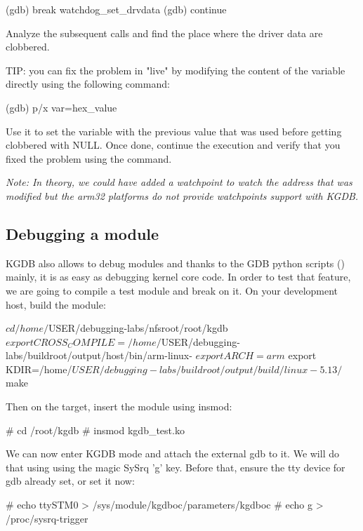 \begin{bashinput}
(gdb) break watchdog_set_drvdata
(gdb) continue
\end{bashinput}

Analyze the subsequent calls and find the place where the driver data are
clobbered.

TIP: you can fix the problem in "live" by modifying the content of the
 variable directly using the following command:

\begin{bashinput}
(gdb) p/x var=hex_value
\end{bashinput}

Use it to set the variable with the previous value that was used before getting
clobbered with NULL. Once done, continue the execution and verify that you fixed
the problem using the  command.

{\em Note: In theory, we could have added a watchpoint to watch the address that
was modified but the arm32 platforms do not provide watchpoints support with
KGDB.}

\subsection{Debugging a module}

KGDB also allows to debug modules and thanks to the GDB python scripts
() mainly, it is as easy as debugging kernel core code. In
order to test that feature, we are going to compile a test module and break on
it. On your development host, build the module:

\begin{bashinput}
$ cd /home/$USER/debugging-labs/nfsroot/root/kgdb
$ export CROSS_COMPILE=/home/$USER/debugging-labs/buildroot/output/host/bin/arm-linux-
$ export ARCH=arm
$ export KDIR=/home/$USER/debugging-labs/buildroot/output/build/linux-5.13/
$ make
\end{bashinput}

Then on the target, insert the module using insmod:
\begin{bashinput}
# cd /root/kgdb
# insmod kgdb_test.ko
\end{bashinput}

We can now enter KGDB mode and attach the external gdb to it. We will do
that using using the magic SySrq 'g' key. Before that, ensure the tty
device for gdb already set, or set it now:

\begin{bashinput}
# echo ttySTM0 > /sys/module/kgdboc/parameters/kgdboc
# echo g > /proc/sysrq-trigger
\end{bashinput}

